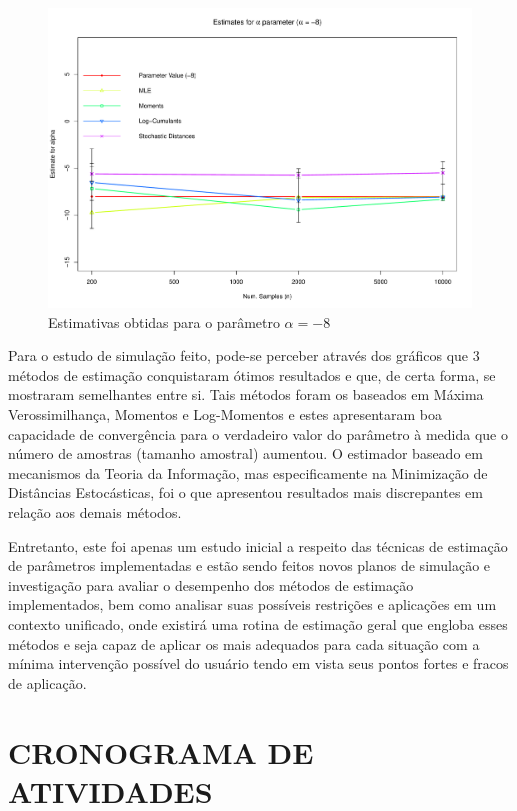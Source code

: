 \documentclass[12pt]{article}
\begin{document}
\begin{figure}[H]
     \centering
     \includegraphics[scale=0.5]{plots/ComparisonAlpha-8.pdf}
     \caption{Estimativas obtidas para o parâmetro $\alpha = -8$}
     \label{graf_3}
\end{figure}

Para o estudo de simulação feito, pode-se perceber através dos gráficos que 3 métodos de estimação conquistaram ótimos resultados e que, de certa forma, se mostraram semelhantes entre si. Tais métodos foram os baseados em Máxima Verossimilhança, Momentos e Log-Momentos e estes apresentaram boa capacidade de convergência para o verdadeiro valor do parâmetro à medida que o número de amostras (tamanho amostral) aumentou. O estimador baseado em mecanismos da Teoria da Informação, mas especificamente na Minimização de Distâncias Estocásticas, foi o que apresentou resultados mais discrepantes em relação aos demais métodos.

Entretanto, este foi apenas um estudo inicial a respeito das técnicas de estimação de parâmetros implementadas e estão sendo feitos novos planos de simulação e investigação para avaliar o desempenho dos métodos de estimação implementados, bem como analisar suas possíveis restrições e aplicações em um contexto unificado, onde existirá uma rotina de estimação geral que engloba esses métodos e seja capaz de aplicar os mais adequados para cada situação com a mínima intervenção possível do usuário tendo em vista seus pontos fortes e fracos de aplicação. 


\newpage
\section*{\centering \textbf{CRONOGRAMA DE ATIVIDADES}}
\vspace{0.5cm}
\end{document}
